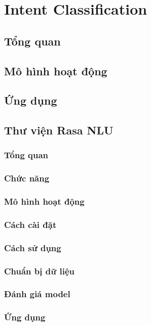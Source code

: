 \chapter{Intent Classification}
\ifpdf
    \graphicspath{{Chapter5/Chapter5Figs/PNG/}{Chapter5/Chapter5Figs/PDF/}{Chapter5/Chapter5Figs/}}
\else
    \graphicspath{{Chapter5/Chapter5Figs/EPS/}{Chapter5/Chapter5Figs/}}
\fi

\section{Tổng quan}
\section{Mô hình hoạt động}
\section{Ứng dụng}
\section{Thư viện Rasa NLU}
\subsection{Tổng quan}
\subsection{Chức năng}
\subsection{Mô hình hoạt động}
\subsection{Cách cài đặt}
\subsection{Cách sử dụng}
\subsection{Chuẩn bị dữ liệu}
\subsection{Đánh giá model}
\subsection{Ứng dụng}
